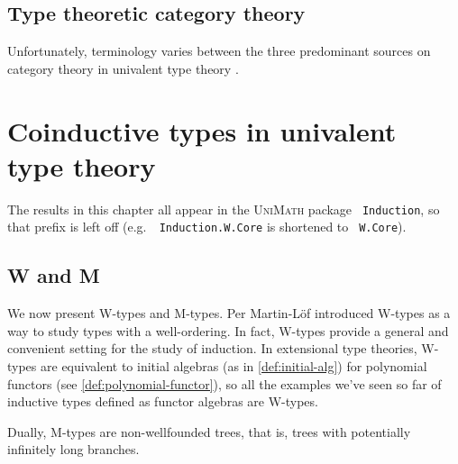 \documentclass[12pt,twoside]{reedthesis}
\let\oldindex\index
\renewcommand{\index}[1]
               {\oldindex{#1}\marginpar{\footnotesize\color{index}index: #1}}
\newcommand{\indeX}{\oldindex}
\newcommand{\indeX}{\index}
\newcommand{\software}[1]{{\textsc{#1}}\indeX{#1}}
\newcommand{\UniMath}{\software{UniMath}}
\newcommand{\unimathname}[1]{\texttt{\footnotesize\color{accepted} #1}}
\begin{document}
\section{Type theoretic category theory}
\label{sec:type-theoretic-category-theory}

Unfortunately, terminology varies between the three predominant sources
on category theory in univalent type theory \cite{book} \cite{unimath}
\cite{hott-lib}.

\chapter{Coinductive types in univalent type theory}
\label{chap:coinductive-types-in-univalent-type-theory}

The results in this chapter all appear in the \UniMath{} package
\unimathname{Induction}, so that prefix is left off
(e.g.\ \unimathname{Induction.W.Core} is shortened to
\unimathname{W.Core}).

\section{W and M}
\label{sec:w-and-m}

We now present W-types and M-types. Per Martin-Löf introduced W-types as a
way to study types with a well-ordering. In fact, W-types provide a general and
convenient setting for the study of induction. In extensional type theories,
W-types are equivalent to initial algebras (as in \cref{def:initial-alg}) for
polynomial functors (see \cref{def:polynomial-functor}), so all the examples
we've seen so far of inductive types defined as functor algebras are W-types.

Dually, M-types are non-wellfounded trees, that is, trees with potentially
infinitely long branches.
\end{document}
